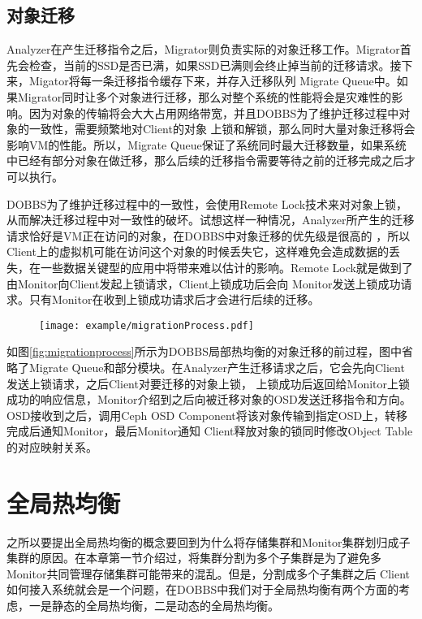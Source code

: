\subsection{对象迁移}
Analyzer在产生迁移指令之后，Migrator则负责实际的对象迁移工作。Migrator首先会检查，当前的SSD是否已满，如果SSD已满则会终止掉当前的迁移请求。接下来，Migator将每一条迁移指令缓存下来，并存入迁移队列
Migrate Queue中。如果Migrator同时让多个对象进行迁移，那么对整个系统的性能将会是灾难性的影响。因为对象的传输将会大大占用网络带宽，并且DOBBS为了维护迁移过程中对象的一致性，需要频繁地对Client的对象
上锁和解锁，那么同时大量对象迁移将会影响VM的性能。所以，Migrate Queue保证了系统同时最大迁移数量，如果系统中已经有部分对象在做迁移，那么后续的迁移指令需要等待之前的迁移完成之后才可以执行。

DOBBS为了维护迁移过程中的一致性，会使用Remote Lock技术来对对象上锁，从而解决迁移过程中对一致性的破坏。试想这样一种情况，Analyzer所产生的迁移请求恰好是VM正在访问的对象，在DOBBS中对象迁移的优先级是很高的
，所以Client上的虚拟机可能在访问这个对象的时候丢失它，这样难免会造成数据的丢失，在一些数据关键型的应用中将带来难以估计的影响。Remote Lock就是做到了由Monitor向Client发起上锁请求，Client上锁成功后会向
Monitor发送上锁成功请求。只有Monitor在收到上锁成功请求后才会进行后续的迁移。

\begin{figure}[!htp]
    \centering
    \texttt{[image: example/migrationProcess.pdf]}
\end{figure}

如图\ref{fig:migrationprocess}所示为DOBBS局部热均衡的对象迁移的前过程，图中省略了Migrate Queue和部分模块。在Analyzer产生迁移请求之后，它会先向Client发送上锁请求，之后Client对要迁移的对象上锁，
上锁成功后返回给Monitor上锁成功的响应信息，Monitor介绍到之后向被迁移对象的OSD发送迁移指令和方向。OSD接收到之后，调用Ceph OSD Component将该对象传输到指定OSD上，转移完成后通知Monitor，最后Monitor通知
Client释放对象的锁同时修改Object Table的对应映射关系。


\section{全局热均衡}
之所以要提出全局热均衡的概念要回到为什么将存储集群和Monitor集群划归成子集群的原因。在本章第一节介绍过，将集群分割为多个子集群是为了避免多Monitor共同管理存储集群可能带来的混乱。但是，分割成多个子集群之后
Client如何接入系统就会是一个问题，在DOBBS中我们对于全局热均衡有两个方面的考虑，一是静态的全局热均衡，二是动态的全局热均衡。


